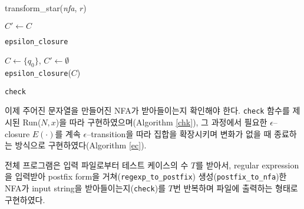 \documentclass{article}
\begin{document}
\begin{multicols}{2}
\begin{center}
transform\_star(\textit{nfa}, $r$)
\vspace{0.5cm}
\end{center}

\begin{algorithm}[H]
	$C' \leftarrow C$\\
	\caption{\texttt{epsilon\_closure}\label{ec}}
\end{algorithm}

\begin{algorithm}[H]
	$C \leftarrow \{q_0\}$, $C' \leftarrow \emptyset$\\
	\texttt{epsilon\_closure}($C$)\\
	\caption{\texttt{check}\label{chk}}
\end{algorithm}
\vspace{0.5cm}

이제 주어진 문자열을 만들어진 NFA가 받아들이는지 확인해야 한다. \texttt{check} 함수를 제시된 Run($N,x$)을 따라 구현하였으며(Algorithm \ref{chk}), 그 과정에서 필요한 $\epsilon$--closure $E(\cdot)$를 계속 $\epsilon$--transition을 따라 집합을 확장시키며 변화가 없을 때 종료하는 방식으로 구현하였다(Algorithm \ref{ec}).

전체 프로그램은 입력 파일로부터 테스트 케이스의 수 $T$를 받아서, regular expression을 입력받아 postfix form을 거쳐(\texttt{regexp\_to\_postfix}) 생성(\texttt{postfix\_to\_nfa})한 NFA가 input string을 받아들이는지(\texttt{check})를 $T$번 반복하며 파일에 출력하는 형태로 구현하였다.


\end{multicols}
\end{document}
